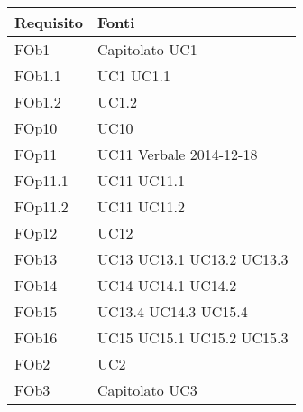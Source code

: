 \begin{longtable}{|l|p{4cm}|}
\hline
\textbf{Requisito} & \textbf{Fonti} \\
\hline
FOb1 & Capitolato \linebreak UC1 \linebreak \\ 
\hline
FOb1.1 & UC1 \linebreak  UC1.1 \linebreak  \\ 
\hline
FOb1.2 & UC1.2 \linebreak  \\ 
\hline
FOp10 & UC10 \linebreak \\ 
\hline
FOp11 & UC11 \linebreak Verbale 2014-12-18 \linebreak \\ 
\hline
FOp11.1 & UC11 \linebreak  UC11.1 \linebreak  \\ 
\hline
FOp11.2 & UC11 \linebreak  UC11.2 \linebreak  \\ 
\hline
FOp12 & UC12 \linebreak \\ 
\hline
FOb13 & UC13 \linebreak UC13.1 \linebreak UC13.2 \linebreak UC13.3 \linebreak \\ 
\hline
FOb14 & UC14 \linebreak UC14.1 \linebreak UC14.2 \linebreak \\ 
\hline
FOb15 & UC13.4 \linebreak UC14.3 \linebreak UC15.4 \linebreak \\ 
\hline
FOb16 & UC15 \linebreak UC15.1 \linebreak UC15.2 \linebreak UC15.3 \linebreak \\ 
\hline
FOb2 & UC2 \linebreak \\ 
\hline
FOb3 & Capitolato \linebreak UC3 \linebreak \\ 

\end{longtable}
